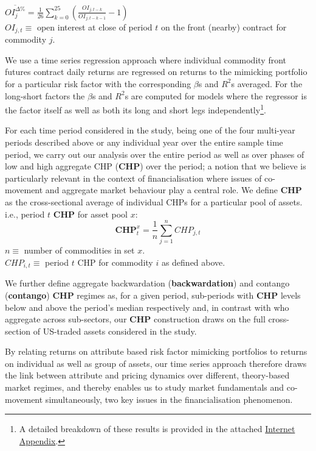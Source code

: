 \documentclass[
  authoryear,
  preprint,
  3p]{elsarticle}
\begin{document}
\(\overline{OI_{j}^{\Delta \%}}=\frac{1}{26}\sum_{k=0}^{25}(\frac{OI_{j,t-k}}{OI_{j,t-k-1}} - 1)\)\\
\(OI_{j,t}\equiv\) open interest at close of period \(t\) on the front
(nearby) contract for commodity \(j\).

\medskip

We use a time series regression approach where individual commodity
front futures contract daily returns are regressed on returns to the
mimicking portfolio for a particular risk factor with the corresponding
\(\beta\)s and \(R^{2}\)s averaged. For the long-short factors the
\(\beta\)s and \(R^{2}\)s are computed for models where the regressor is
the factor itself as well as both its long and short legs
independently\footnote{A detailed breakdown of these results is provided
  in the attached
  \href{https://bautheac.shinyapps.io/co-movement/}{Internet Appendix}.}.

For each time period considered in the study, being one of the four
multi-year periods described above or any individual year over the
entire sample time period, we carry out our analysis over the entire
period as well as over phases of low and high aggregate CHP
(\textbf{CHP}) over the period; a notion that we believe is particularly
relevant in the context of financialisation where issues of co-movement
and aggregate market behaviour play a central role. We define
\textbf{CHP} as the cross-sectional average of individual CHPs for a
particular pool of assets. i.e., period \(t\) \textbf{CHP} for asset
pool \(x\): \[\mathbf{CHP}_{t}^{x}=\frac{1}{n}\sum_{j=1}^{n}CHP_{j,t}\]
\(n\equiv\) number of commodities in set \(x\).\\
\(CHP_{i,t}\equiv\) period \(t\) CHP for commodity \(i\) as defined
above.

\medskip

We further define aggregate backwardation (\textbf{backwardation}) and
contango (\textbf{contango}) \textbf{CHP} regimes as, for a given
period, sub-periods with \textbf{CHP} levels below and above the
period's median respectively and, in contrast with
\citep{hong_what_2012} who aggregate across sub-sectors, our
\textbf{CHP} construction draws on the full cross-section of US-traded
assets considered in the study.

\bigskip
\bigskip

By relating returns on attribute based risk factor mimicking portfolios
to returns on individual as well as group of assets, our time series
approach therefore draws the link between attribute and pricing dynamics
over different, theory-based market regimes, and thereby enables us to
study market fundamentals and co-movement simultaneously, two key issues
in the financialisation phenomenon.
\end{document}
